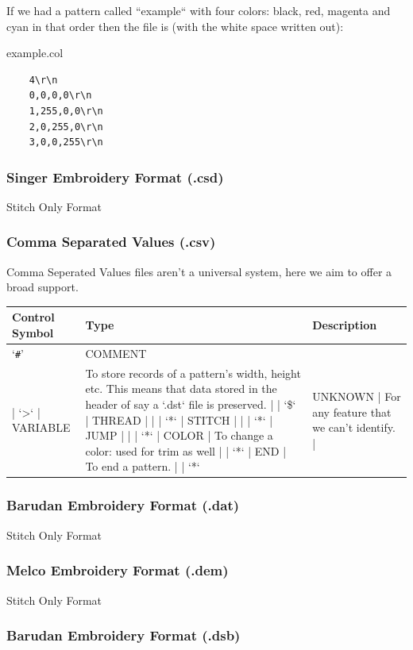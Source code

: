 \documentclass[a4paper, 11pt]{report}
\begin{document}
If we had a pattern called ``example`` with four colors: black, red, magenta and 
cyan in that order then the file is (with the white space written out):

example.col

\begin{verbatim}
    4\r\n
    0,0,0,0\r\n
    1,255,0,0\r\n
    2,0,255,0\r\n
    3,0,0,255\r\n
\end{verbatim}

\subsubsection{Singer Embroidery Format (.csd)}

Stitch Only Format

\subsubsection{Comma Separated Values (.csv)}

Comma Seperated Values files aren't a universal system, here we aim to
offer a broad support.

\begin{tabular}{l l l}
Control Symbol & Type & Description \\
\hline
`\texttt{\#}' & COMMENT & \\
| `>` | VARIABLE & To store records of a pattern's width, height etc. This means that data stored in the header of say a `.dst` file is preserved. |
| `\$` | THREAD | |
| `*` | STITCH | |
| `*` | JUMP | |
| `*` | COLOR | To change a color: used for trim as well |
| `*` | END | To end a pattern. |
| `*` & UNKNOWN | For any feature that we can't identify. |
\end{tabular}

\subsubsection{Barudan Embroidery Format (.dat)}

Stitch Only Format

\subsubsection{Melco Embroidery Format (.dem)}

Stitch Only Format

\subsubsection{Barudan Embroidery Format (.dsb)}
\end{document}
